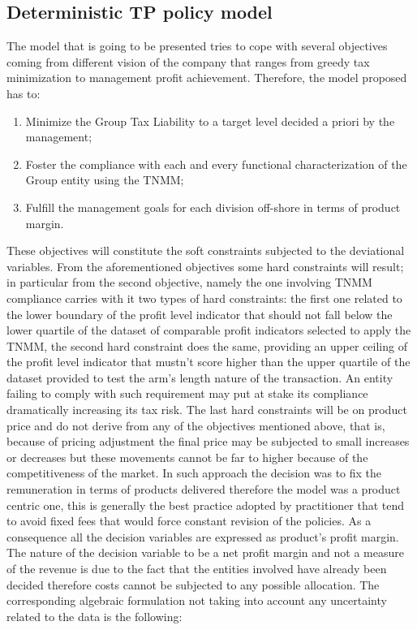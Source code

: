\documentclass[conference,final,]{IEEEtran}
\providecommand{\tightlist}{%
  \setlength{\itemsep}{0pt}\setlength{\parskip}{0pt}}
\begin{document}
\hypertarget{deterministic-model}{%
\subsection{Deterministic TP policy model}\label{the-model}}
The model that is going to be presented tries to cope with several objectives coming from different vision of the company that ranges from greedy tax minimization to management profit achievement. Therefore, the model proposed has to:
\begin{enumerate}
\def\labelenumi{\arabic{enumi}.}
\tightlist
\item
  Minimize the Group Tax Liability to a target level decided a priori by
  the management;
\item
  Foster the compliance with each and every functional characterization
  of the Group entity using the TNMM;
\item
  Fulfill the management goals for each division off-shore in terms of
  product margin.
\end{enumerate}
These objectives will constitute the soft constraints subjected to the deviational variables. From the aforementioned objectives some hard constraints will result; in particular from the second objective, namely the one involving TNMM compliance carries with it two types of hard constraints: the first one related to the lower boundary of the profit level indicator that should not fall below the lower quartile of the dataset of comparable profit indicators selected to apply the TNMM, the second hard constraint does the same, providing an upper ceiling of the profit level indicator that mustn't score higher than the upper quartile of the dataset provided to test the arm's length nature of the transaction. An entity failing to comply with such requirement may put at stake its compliance dramatically increasing its tax risk. The last hard constraints will be on product price and do not derive from any of the objectives mentioned above, that is, because of pricing adjustment the final price may be subjected to small increases or decreases but these movements cannot be far to higher because of the competitiveness of the market. In such approach the decision was to fix the remuneration in terms of products delivered therefore the model was a product centric one, this is generally the best practice adopted by practitioner that tend to avoid fixed fees that would force constant revision of the policies. As a consequence all the decision variables are expressed as product's profit margin. The nature of the decision variable to be a net profit margin and not a measure of the revenue is due to the fact that the entities involved have already been decided therefore costs cannot be subjected to any possible allocation. The corresponding algebraic formulation not taking into account any uncertainty related to the data is the following:
\end{document}

